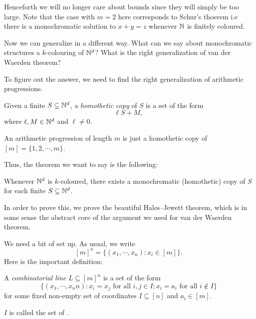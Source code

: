 \documentclass[a4paper]{article}
\begin{document}
Henceforth we will no longer care about bounds since they will simply be too large. Note that the case with $m = 2$ here corresponds to Schur's thoerem i.e there is a monochromatic solution to $x + y = z$ whenever $\mathbb{N}$ is finitely coloured.


Now we can generalize in a different way. What can we say about monochromatic structures a $k$-colouring of $\mathbb{N}^d$? What is the right generalization of van der Waerden theorem?

To figure out the answer, we need to find the right generalization of arithmetic progressions.

\begin{defi}
  Given a finite $S \subseteq \mathbb{N}^d$, a \emph{homothetic copy} of $S$ is a set of the form
  \[
    \ell S + M,
  \]
  where $\ell, M \in \mathbb{N}^d$ and $\ell \not= 0$.
\end{defi}

\begin{eg}
  An arithmetic progression of length $m$ is just a homothetic copy of $[m] = \{1, 2, \cdots, m\}$.
\end{eg}

Thus, the theorem we want to say is the following:
\begin{thm}[Gallai]
  Whenever $\mathbb{N}^d$ is $k$-coloured, there exists a monochromatic (homothetic) copy of $S$ for each finite $S \subseteq \mathbb{N}^d$.
\end{thm}

In order to prove this, we prove the beautiful Hales--Jewett theorem, which is in some sense the abstract core of the argument we used for van der Waerden theorem.

We need a bit of set up. As usual, we write
\[
  [m]^n = \{(x_1, \cdots, x_n): x_i \in [m]\}.
\]
Here is the important definition:
\begin{defi}
  A \emph{combinatorial line} $L \subseteq [m]^n$ is a set of the form
  \[
    \{(x_1, \cdots, x_nn): x_i = x_j\text{ for all }i, j \in I; x_i = a_i\text{ for all }i \not\in I\}
  \]
  for some fixed non-empty set of coordinates $I \subseteq [n]$ and $a_i \in [m]$.

  $I$ is called the set of .
\end{defi}
\end{document}
